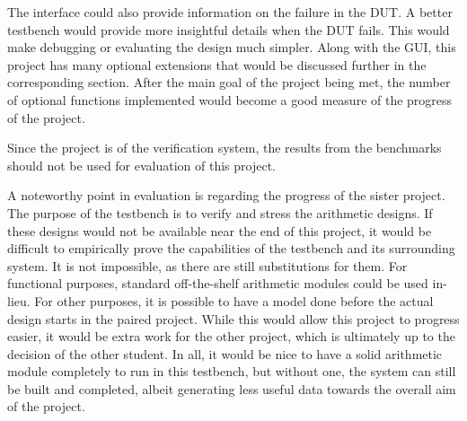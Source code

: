 The interface could also provide information on the failure in the DUT.
A better testbench would provide more insightful details when the DUT fails.
This would make debugging or evaluating the design much simpler.
Along with the GUI, this project has many optional extensions that would be
discussed further in the corresponding section.
After the main goal of the project being met, the number of optional functions
implemented would become a good measure of the progress of the project.

Since the project is of the verification system, the results from the benchmarks
should not be used for evaluation of this project.

A noteworthy point in evaluation is regarding the progress of the sister project.
The purpose of the testbench is to verify and stress the arithmetic designs.
If these designs would not be available near the end of this project,
it would be difficult to empirically prove the capabilities of the testbench
and its surrounding system.
It is not impossible, as there are still substitutions for them.
For functional purposes, standard off-the-shelf arithmetic modules could be
used in-lieu.
For other purposes, it is possible to have a model done before the actual design
starts in the paired project.
While this would allow this project to progress easier, it would be extra work
for the other project, which is ultimately up to the decision of the other
student.
In all, it would be nice to have a solid arithmetic module completely to run
in this testbench, but without one, the system can still be built and completed,
albeit generating less useful data towards the overall aim of the project.
